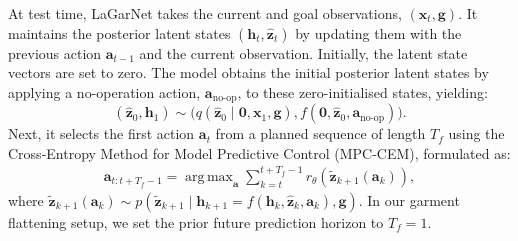 \documentclass[journal]{IEEEtran}
\DeclareMathOperator*{\argmax}{arg\,max}
\newcommand{\addinfo}[1]{\textcolor{myPurple}{#1}}
\begin{document}
\addinfo{At test time, LaGarNet takes the current and goal observations, $(\bm{x}_t, \bm{g})$. It maintains the posterior latent states $(\bm{h}_t, \hat{\bm{z}}_t)$ by updating them with the previous action $\bm{a}_{t-1}$ and the current observation. Initially, the latent state vectors are set to zero. The model obtains the initial posterior latent states by applying a no-operation action, $\bm{a}_{\text{no-op}}$, to these zero-initialised states, yielding:
\begin{equation}
    (\hat{\bm{z}}_0, \bm{h}_1) \sim \Big(q(\hat{\bm{z}}_0 \;|\; \bm{0}, \bm{x}_1, \bm{g}), f(\bm{0}, \hat{\bm{z}}_{0}, \bm{a}_{\text{no-op}})\Big).
\end{equation}
Next, it selects the first action $\bm{a}_t$ from a planned sequence of length $T_f$ using the Cross-Entropy Method for Model Predictive Control (MPC-CEM), formulated as:
\begin{align}
   \bm{a}_{t:t+T_f-1} = \argmax_{\bm{a}} \sum_{k=t}^{t+T_f-1} r_\theta(\tilde{\bm{z}}_{k+1}(\bm{a}_k)),
\end{align}
where $\tilde{\bm{z}}_{k+1}(\bm{a}_k) \sim p(\tilde{\bm{z}}_{k+1} \;|\; \bm{h}_{k+1}=f(\bm{h}_k, \hat{\bm{z}}_k, \bm{a}_k), \bm{g})$. In our garment flattening setup, we set the prior future prediction horizon to $T_f=1$. }




\end{document}
